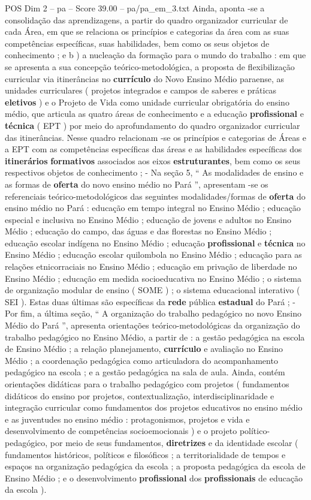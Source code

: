 \begin{textsample}{POS Dim 2 – pa – Score 39.00 – pa/pa\_em\_3.txt}
Ainda, aponta -se a consolidação das aprendizagens, a partir do quadro organizador curricular de cada Área, em que se relaciona os princípios e categorias da área com as suas competências específicas, suas habilidades, bem como os seus objetos de conhecimento ; e b ) a nucleação da formação para o mundo do trabalho : em que se apresenta a sua concepção teórico-metodológica, a proposta de flexibilização curricular via itinerâncias no \textbf{currículo} do Novo Ensino Médio paraense, as unidades curriculares ( projetos integrados e campos de saberes e práticas \textbf{eletivos} ) e o Projeto de Vida como unidade curricular obrigatória do ensino médio, que articula as quatro áreas de conhecimento e a educação \textbf{profissional} e \textbf{técnica} ( EPT ) por meio do aprofundamento do quadro organizador curricular das itinerâncias.
Nesse quadro relacionam -se os princípios e categorias de Áreas e a EPT com as competências específicas das áreas e as habilidades específicas dos \textbf{itinerários} \textbf{formativos} associados aos eixos \textbf{estruturantes}, bem como os seus respectivos objetos de conhecimento ; - Na seção 5, “ As modalidades de ensino e as formas de \textbf{oferta} do novo ensino médio no Pará ”, apresentam -se os referenciais teórico-metodológicos das seguintes modalidades/formas de \textbf{oferta} do ensino médio no Pará : educação em tempo integral no Ensino Médio ; educação especial e inclusiva no Ensino Médio ; educação de jovens e adultos no Ensino Médio ; educação do campo, das águas e das florestas no Ensino Médio ; educação escolar indígena no Ensino Médio ; educação \textbf{profissional} e \textbf{técnica} no Ensino Médio ; educação escolar quilombola no Ensino Médio ; educação para as relações etnicorraciais no Ensino Médio ; educação em privação de liberdade no Ensino Médio ; educação em medida socioeducativa no Ensino Médio ; o sistema de organização modular de ensino ( SOME ) ; o sistema educacional interativo ( SEI ).
Estas duas últimas são específicas da \textbf{rede} pública \textbf{estadual} do Pará ; - Por fim, a última seção, “ A organização do trabalho pedagógico no novo Ensino Médio do Pará ”, apresenta orientações teórico-metodológicas da organização do trabalho pedagógico no Ensino Médio, a partir de : a gestão pedagógica na escola de Ensino Médio ; a relação planejamento, \textbf{currículo} e avaliação no Ensino Médio ; a coordenação pedagógica como articuladora do acompanhamento pedagógico na escola ; e a gestão pedagógica na sala de aula.
Ainda, contém orientações didáticas para o trabalho pedagógico com projetos ( fundamentos didáticos do ensino por projetos, contextualização, interdisciplinaridade e integração curricular como fundamentos dos projetos educativos no ensino médio e as juventudes no ensino médio : protagonismos, projetos e vida e desenvolvimento de competências socioemocionais ) e o projeto político-pedagógico, por meio de seus fundamentos, \textbf{diretrizes} e da identidade escolar ( fundamentos históricos, políticos e filosóficos ; a territorialidade de tempos e espaços na organização pedagógica da escola ; a proposta pedagógica da escola de Ensino Médio ; e o desenvolvimento \textbf{profissional} dos \textbf{profissionais} de educação da escola ).

\end{textsample}
